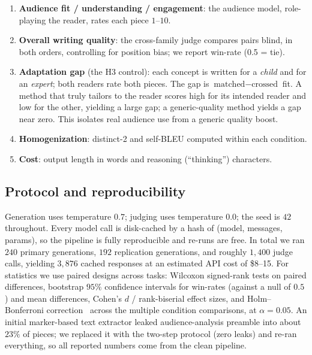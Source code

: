 \begin{enumerate}[leftmargin=*,itemsep=1pt,topsep=2pt]
    \item \textbf{Audience fit / understanding / engagement}: the audience model, role-playing the
    reader, rates each piece $1$--$10$.
    \item \textbf{Overall writing quality}: the cross-family judge compares pairs blind, in both
    orders, controlling for position bias; we report win-rate (0.5 = tie).
    \item \textbf{Adaptation gap} (the H3 control): each concept is written for a \emph{child} and
    for an \emph{expert}; both readers rate both pieces. The gap is $\text{matched} -
    \text{crossed}$ fit. A method that truly tailors to the reader scores high for its intended
    reader and low for the other, yielding a large gap; a generic-quality method yields a gap near
    zero. This isolates real audience use from a generic quality boost.
    \item \textbf{Homogenization}: distinct-2 and self-BLEU computed within each condition.
    \item \textbf{Cost}: output length in words and reasoning (``thinking'') characters.
\end{enumerate}

\subsection{Protocol and reproducibility}

Generation uses temperature $0.7$; judging uses temperature $0.0$; the seed is $42$ throughout.
Every model call is disk-cached by a hash of (model, messages, params), so the pipeline is fully
reproducible and re-runs are free. In total we ran $240$ primary generations, $192$ replication
generations, and roughly $1{,}400$ judge calls, yielding $3{,}876$ cached responses at an estimated
API cost of \$8--15. For statistics we use paired designs across tasks: Wilcoxon signed-rank tests
on paired differences, bootstrap $95\%$ confidence intervals for win-rates (against a null of
$0.5$) and mean differences, Cohen's $d$ / rank-biserial effect sizes, and
Holm--Bonferroni correction~\citep{holm1979simple} across the multiple condition comparisons, at
$\alpha = 0.05$. An initial marker-based text extractor leaked audience-analysis preamble into
about $23\%$ of \simtom pieces; we replaced it with the two-step protocol (zero leaks) and re-ran
everything, so all reported numbers come from the clean pipeline.
